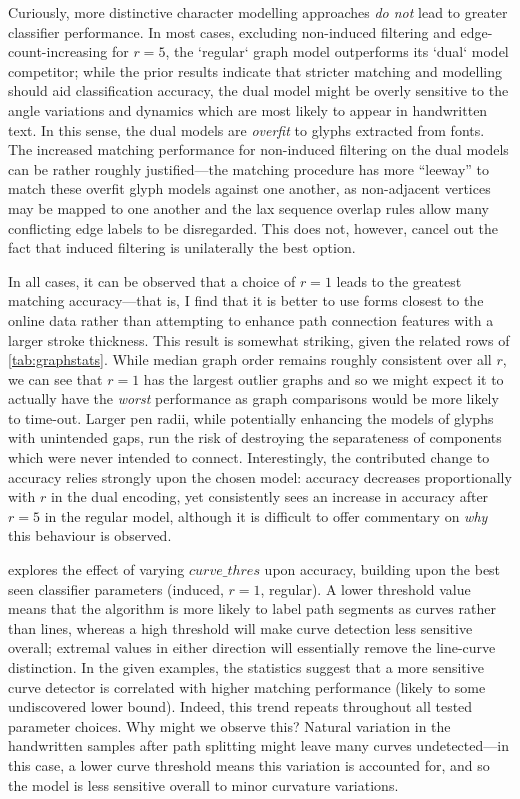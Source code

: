 \documentclass{mpaper}
\begin{document}
Curiously, more distinctive character modelling approaches \emph{do not} lead to greater classifier performance.
In most cases, excluding non-induced filtering and edge-count-increasing for $r=5$, the `regular` graph model outperforms its `dual` model competitor; while the prior results indicate that stricter matching and modelling should aid classification accuracy, the dual model might be overly sensitive to the angle variations and dynamics which are most likely to appear in handwritten text.
In this sense, the dual models are \emph{overfit} to glyphs extracted from fonts.
The increased matching performance for non-induced filtering on the dual models can be rather roughly justified---the matching procedure has more ``leeway'' to match these overfit glyph models against one another, as non-adjacent vertices may be mapped to one another and the lax sequence overlap rules allow many conflicting edge labels to be disregarded.
This does not, however, cancel out the fact that induced filtering is unilaterally the best option.

In all cases, it can be observed that a choice of $r=1$ leads to the greatest matching accuracy---that is, I find that it is better to use forms closest to the online data rather than attempting to enhance path connection features with a larger stroke thickness.
This result is somewhat striking, given the related rows of \cref{tab:graphstats}.
While median graph order remains roughly consistent over all $r$, we can see that $r=1$ has the largest outlier graphs and so we might expect it to actually have the \emph{worst} performance as graph comparisons would be more likely to time-out.
Larger pen radii, while potentially enhancing the models of glyphs with unintended gaps, run the risk of destroying the separateness of components which were never intended to connect.
Interestingly, the contributed change to accuracy relies strongly upon the chosen model: accuracy decreases proportionally with $r$ in the dual encoding, yet consistently sees an increase in accuracy after $r=5$ in the regular model, although it is difficult to offer commentary on \emph{why} this behaviour is observed.

 explores the effect of varying $\mathit{curve\_thres}$ upon accuracy, building upon the best seen classifier parameters (induced, $r=1$, regular).
A lower threshold value means that the algorithm is more likely to label path segments as curves rather than lines, whereas a high threshold will make curve detection less sensitive overall; extremal values in either direction will essentially remove the line-curve distinction.
In the given examples, the statistics suggest that a more sensitive curve detector is correlated with higher matching performance (likely to some undiscovered lower bound).
Indeed, this trend repeats throughout all tested parameter choices.
Why might we observe this?
Natural variation in the handwritten samples after path splitting might leave many curves undetected---in this case, a lower curve threshold means this variation is accounted for, and so the model is less sensitive overall to minor curvature variations.
\end{document}
